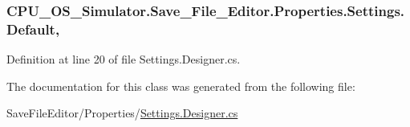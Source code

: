 \subsubsection[{Default}]{ C\+P\+U\+\_\+\+O\+S\+\_\+\+Simulator.\+Save\+\_\+\+File\+\_\+\+Editor.\+Properties.\+Settings.\+Default\hspace{0.3cm}{\ttfamily [static]}, {\ttfamily [get]}}\label{class_c_p_u___o_s___simulator_1_1_save___file___editor_1_1_properties_1_1_settings_a3db80e49faed58731091e92cb2a32e85}


Definition at line 20 of file Settings.\+Designer.\+cs.



The documentation for this class was generated from the following file\+:\begin{DoxyCompactItemize}
\item 
Save\+File\+Editor/\+Properties/\hyperlink{_save_file_editor_2_properties_2_settings_8_designer_8cs}{Settings.\+Designer.\+cs}\end{DoxyCompactItemize}
